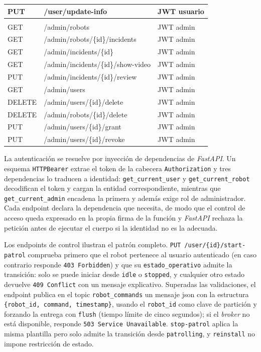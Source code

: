 \begin{table}[htbp]
\begin{tabular}{@{}>{\ttfamily}l >{\ttfamily}l l@{}}
    PUT    & /user/update-info       & JWT usuario \\
    \midrule
    \multicolumn{3}{@{}l}{\textit{Ámbito administración}} \\
    GET    & /admin/robots           & JWT admin \\
    GET    & /admin/robots/\{id\}/incidents & JWT admin \\
    GET    & /admin/incidents/\{id\}   & JWT admin \\
    GET    & /admin/incidents/\{id\}/show-video & JWT admin \\
    PUT    & /admin/incidents/\{id\}/review & JWT admin \\
    GET    & /admin/users            & JWT admin \\
    DELETE & /admin/users/\{id\}/delete & JWT admin \\
    DELETE & /admin/robots/\{id\}/delete & JWT admin \\
    PUT    & /admin/users/\{id\}/grant  & JWT admin \\
    PUT    & /admin/users/\{id\}/revoke & JWT admin \\
    \bottomrule
  \end{tabular}
\end{table}

La autenticación se resuelve por inyección de dependencias de \textit{FastAPI}. Un
esquema \texttt{HTTPBearer} extrae el token de la cabecera \texttt{Authorization} y
tres dependencias lo traducen a identidad: \texttt{get\_current\_user} y
\texttt{get\_current\_robot} decodifican el token y cargan la entidad
correspondiente, mientras que \texttt{get\_current\_admin} encadena la primera y
además exige rol de administrador. Cada endpoint declara la dependencia que necesita,
de modo que el control de acceso queda expresado en la propia firma de la función y
\textit{FastAPI} rechaza la petición antes de ejecutar el cuerpo si la identidad no es
la adecuada.

Los endpoints de control ilustran el patrón completo. \texttt{PUT
/user/\{id\}/start-patrol} comprueba primero que el robot pertenece al usuario
autenticado (en caso contrario responde \texttt{403 Forbidden}) y que su
\texttt{estado\_operativo} admite la transición: solo se puede iniciar desde
\texttt{idle} o \texttt{stopped}, y cualquier otro estado devuelve \texttt{409
Conflict} con un mensaje explicativo. Superadas las validaciones, el endpoint publica
en el topic \texttt{robot\_commands} un mensaje \gls{json} con la estructura
\texttt{\{robot\_id, command, timestamp\}}, usando el \texttt{robot\_id} como clave de
partición y forzando la entrega con \texttt{flush} (tiempo límite de cinco segundos);
si el \textit{broker} no está disponible, responde \texttt{503 Service Unavailable}.
\texttt{stop-patrol} aplica la misma plantilla pero solo admite la transición desde
\texttt{patrolling}, y \texttt{reinstall} no impone restricción de estado.

